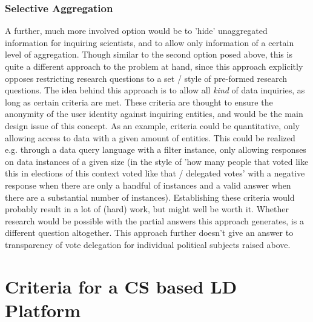 \subsubsection{Selective Aggregation}

A further, much more involved option would be to 'hide' unaggregated information for inquiring scientists, and to allow only information of a certain level of aggregation. Though similar to the second option posed above, this is quite a different approach to the problem at hand, since this approach explicitly opposes restricting research questions to a set / style of pre-formed research questions. The idea behind this approach is to allow all \textit{kind} of data inquiries, as long as certain criteria are met. These criteria are thought to ensure the anonymity of the user identity against inquiring entities, and would be the main design issue of this concept. As an example, criteria could be quantitative, only allowing access to data with a given amount of entities. This could be realized e.g. through a data query language with a filter instance, only allowing responses on data instances of a given size (in the style of 'how many people that voted like this in elections of this context voted like that / delegated votes' with a negative response when there are only a handful of instances and a valid answer when there are a substantial number of instances). Establishing these criteria would probably result in a lot of (hard) work, but might well be worth it. Whether research would be possible with the partial answers this approach generates, is a different question altogether. 
This approach further doesn't give an answer to transparency of vote delegation for individual political subjects raised above.

\section{Criteria for a CS based LD Platform}
\label{sec:Criteria}